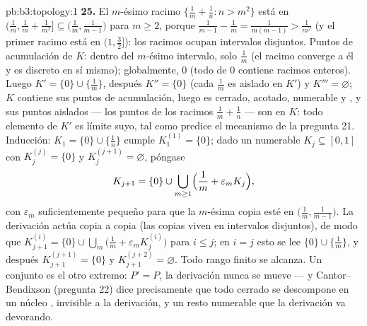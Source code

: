 \begin{solution}{pb:b3:topology:1}
\textbf{25.} El $m$-ésimo racimo $\{\frac1m + \frac1n : n >
m^2\}$ está en $\bigl(\frac1m, \frac1m + \frac1{m^2}\bigr]
\subseteq \bigl(\frac1m, \frac1{m-1}\bigr)$ para $m \geq 2$, porque
$\frac1{m-1} - \frac1m = \frac1{m(m-1)} >
\frac1{m^2}$ (y el primer racimo está en $(1, \frac32]$): los racimos
ocupan intervalos disjuntos. Puntos de acumulación de $K$: dentro del
$m$-ésimo intervalo, solo $\frac1m$ (el racimo converge a él y es
discreto en sí mismo); globalmente, $0$ (todo
 de $0$ contiene racimos
enteros). Luego $K'
= \{0\} \cup \{\frac1m\}$, después $K'' = \{0\}$ (cada $\frac1m$ es
aislado en $K'$) y $K''' = \varnothing$; $K$ contiene sus puntos de
acumulación, luego es cerrado, acotado, numerable y
, y sus puntos aislados ---
los puntos de los racimos $\frac1m +
\frac1n$ --- son  en $K$: todo
elemento de $K'$ es límite suyo, tal como predice el mecanismo de la
pregunta 21. Inducción: $K_1 = \{0\}\cup\{\frac1n\}$ cumple
$K_1^{(1)} = \{0\}$; dado un 
numerable $K_j \subseteq [0, 1]$ con $K_j^{(j)} =
\{0\}$ y $K_j^{(j+1)} = \varnothing$, póngase
\[
K_{j+1} = \{0\} \cup \bigcup_{m \geq 1}
\Bigl(\frac1m + \varepsilon_m K_j\Bigr),
\]
con $\varepsilon_m$ suficientemente pequeño para que la $m$-ésima copia
esté en $\bigl(\frac1m, \frac1{m-1}\bigr)$. La derivación actúa copia a
copia (las copias viven en intervalos  disjuntos), de modo que
$K_{j+1}^{(i)} = \{0\} \cup \bigcup_m\bigl(\frac1m +
\varepsilon_mK_j^{(i)}\bigr)$ para $i \leq j$; en $i = j$ esto se lee
$\{0\} \cup \{\frac1m\}$, y después $K_{j+1}^{(j+1)} =
\{0\}$ y $K_{j+1}^{(j+2)} = \varnothing$. Todo rango finito se alcanza.
Un conjunto  es el otro
extremo: $P' = P$, la derivación nunca se mueve --- y Cantor--Bendixson
(pregunta 22) dice precisamente que todo cerrado se descompone en un
núcleo , invisible a la
derivación, y un resto numerable que la derivación va devorando.
\end{solution}
